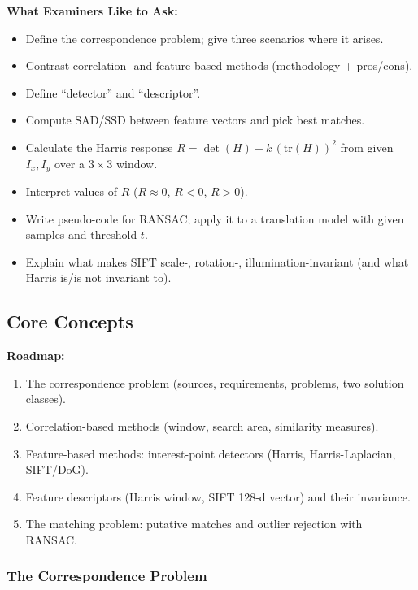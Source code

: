 \separator

\textbf{What Examiners Like to Ask:}
\begin{itemize}
  \item Define the correspondence problem; give three scenarios where it arises.
  \item Contrast correlation- and feature-based methods (methodology + pros/cons).
  \item Define ``detector'' and ``descriptor''.
  \item Compute SAD/SSD between feature vectors and pick best matches.
  \item Calculate the Harris response $R = \det(H) - k\,(\mathrm{tr}(H))^2$ from given $I_x, I_y$ over a $3\times 3$ window.
  \item Interpret values of $R$ ($R\approx 0$, $R<0$, $R>0$).
  \item Write pseudo-code for RANSAC; apply it to a translation model with given samples and threshold $t$.
  \item Explain what makes SIFT scale-, rotation-, illumination-invariant (and what Harris is/is not invariant to).
\end{itemize}

\subsection{Core Concepts}

\textbf{Roadmap:}
\begin{enumerate}
  \item The correspondence problem (sources, requirements, problems, two solution classes).
  \item Correlation-based methods (window, search area, similarity measures).
  \item Feature-based methods: interest-point detectors (Harris, Harris-Laplacian, SIFT/DoG).
  \item Feature descriptors (Harris window, SIFT 128-d vector) and their invariance.
  \item The matching problem: putative matches and outlier rejection with RANSAC.
\end{enumerate}

\bigseparator

\subsubsection{The Correspondence Problem}

